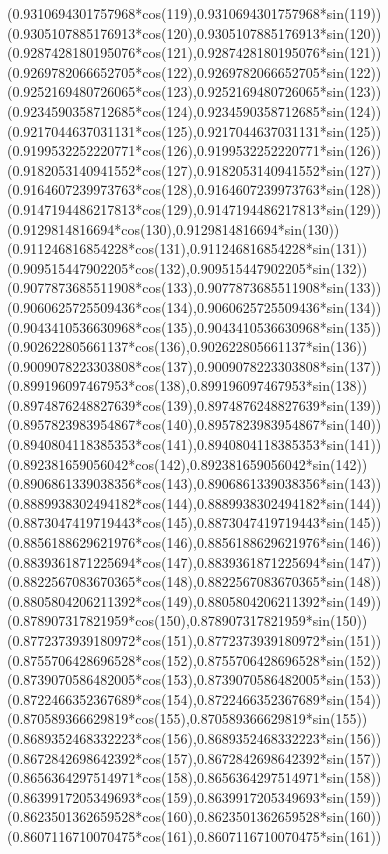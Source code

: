 {({0.9310694301757968*cos(119)},{0.9310694301757968*sin(119)})
({0.9305107885176913*cos(120)},{0.9305107885176913*sin(120)})
({0.9287428180195076*cos(121)},{0.9287428180195076*sin(121)})
({0.9269782066652705*cos(122)},{0.9269782066652705*sin(122)})
({0.9252169480726065*cos(123)},{0.9252169480726065*sin(123)})
({0.9234590358712685*cos(124)},{0.9234590358712685*sin(124)})
({0.9217044637031131*cos(125)},{0.9217044637031131*sin(125)})
({0.9199532252220771*cos(126)},{0.9199532252220771*sin(126)})
({0.9182053140941552*cos(127)},{0.9182053140941552*sin(127)})
({0.9164607239973763*cos(128)},{0.9164607239973763*sin(128)})
({0.9147194486217813*cos(129)},{0.9147194486217813*sin(129)})
({0.9129814816694*cos(130)},{0.9129814816694*sin(130)})
({0.911246816854228*cos(131)},{0.911246816854228*sin(131)})
({0.909515447902205*cos(132)},{0.909515447902205*sin(132)})
({0.9077873685511908*cos(133)},{0.9077873685511908*sin(133)})
({0.9060625725509436*cos(134)},{0.9060625725509436*sin(134)})
({0.9043410536630968*cos(135)},{0.9043410536630968*sin(135)})
({0.902622805661137*cos(136)},{0.902622805661137*sin(136)})
({0.9009078223303808*cos(137)},{0.9009078223303808*sin(137)})
({0.899196097467953*cos(138)},{0.899196097467953*sin(138)})
({0.8974876248827639*cos(139)},{0.8974876248827639*sin(139)})
({0.8957823983954867*cos(140)},{0.8957823983954867*sin(140)})
({0.8940804118385353*cos(141)},{0.8940804118385353*sin(141)})
({0.892381659056042*cos(142)},{0.892381659056042*sin(142)})
({0.8906861339038356*cos(143)},{0.8906861339038356*sin(143)})
({0.8889938302494182*cos(144)},{0.8889938302494182*sin(144)})
({0.8873047419719443*cos(145)},{0.8873047419719443*sin(145)})
({0.8856188629621976*cos(146)},{0.8856188629621976*sin(146)})
({0.8839361871225694*cos(147)},{0.8839361871225694*sin(147)})
({0.8822567083670365*cos(148)},{0.8822567083670365*sin(148)})
({0.8805804206211392*cos(149)},{0.8805804206211392*sin(149)})
({0.878907317821959*cos(150)},{0.878907317821959*sin(150)})
({0.8772373939180972*cos(151)},{0.8772373939180972*sin(151)})
({0.8755706428696528*cos(152)},{0.8755706428696528*sin(152)})
({0.8739070586482005*cos(153)},{0.8739070586482005*sin(153)})
({0.8722466352367689*cos(154)},{0.8722466352367689*sin(154)})
({0.870589366629819*cos(155)},{0.870589366629819*sin(155)})
({0.8689352468332223*cos(156)},{0.8689352468332223*sin(156)})
({0.8672842698642392*cos(157)},{0.8672842698642392*sin(157)})
({0.8656364297514971*cos(158)},{0.8656364297514971*sin(158)})
({0.8639917205349693*cos(159)},{0.8639917205349693*sin(159)})
({0.8623501362659528*cos(160)},{0.8623501362659528*sin(160)})
({0.8607116710070475*cos(161)},{0.8607116710070475*sin(161)})
}
